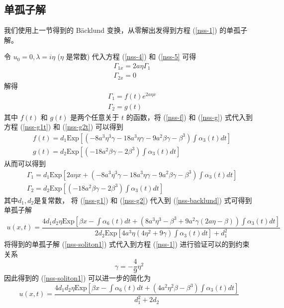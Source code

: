 \subsection{单孤子解}
我们使用上一节得到的 B\"acklund 变换，从零解出发得到方程 (\ref{nss-1}) 的单孤子解。

令 $u_{0} = 0, \lambda = i\eta$ ($\eta$ 是常数) 代入方程 (\ref{nss-4}) 和 (\ref{nss-5} 可得
\begin{align}
  & \Gamma_{1x} = 2a\eta\Gamma_{1} \\
  & \Gamma_{2x} = 0
\end{align}
解得
\begin{align}
  & \Gamma_{1} = f(t)e^{2a\eta x} \label{nss-f} \\
  & \Gamma_{2} = g(t)  \label{nss-g}
\end{align}
其中 $f(t)$ 和 $g(t)$ 是两个任意关于  $t$ 的函数，将 (\ref{nss-f}) 和 (\ref{nss-g}) 式代入到方程 (\ref{nss-g1t}) 和 (\ref{nss-g2t}) 可以得到
\begin{align}
  & f(t) = d_{1}\mathrm{Exp}\left[\left(-8a^3\eta^3\gamma-18a^3\eta \gamma-9a^2\beta \gamma - \beta^3\right)\int \alpha_{3}(t)dt\right] \\
  & g(t) = d_{2}\mathrm{Exp}\left[\left(-18a^2\beta \gamma-2\beta^3\right)\int \alpha_{3}(t)dt\right]
\end{align}
从而可以得到
\begin{align}
  & \Gamma_{1} = d_{1}\mathrm{Exp}\left[2a\eta x + \left(-8a^3\eta^3\gamma-18a^3\eta \gamma-9a^2\beta \gamma - \beta^3\right)\int \alpha_{3}(t)dt\right]  \label{nss-g1} \\
  & \Gamma_{2} = d_{2}\mathrm{Exp}\left[\left(-18a^2\beta \gamma-2\beta^3\right)\int \alpha_{3}(t)dt\right]  \label{nss-g2}
\end{align}
其中$d_{1}, d_{2}$是复常数， 将  (\ref{nss-g1}) 和  (\ref{nss-g2}) 代入到  (\ref{nss-backlund}) 式可得到单孤子解
\begin{align}
    u(x,t) = \dfrac{4d_1d_2\eta\mathrm{Exp}\left[\beta x - \int \alpha_6(t)dt + (8a^3\eta^3-\beta^3+9a^2\gamma(2a\eta-\beta))\int \alpha_3(t)dt\right]}{2d_2 \mathrm{Exp}\left[4a^3\eta(4\eta^2+9\gamma)\int \alpha_3(t)dt\right] + d_1^2} \label{nss-soliton1}
\end{align}
将得到的单孤子解 (\ref{nss-soliton1}) 式代入到方程 (\ref{nss-1}) 进行验证可以的到约束关系
\begin{equation}
  \gamma = -\dfrac{4}{9}\eta^2
\end{equation}
因此得到的 (\ref{nss-soliton1}) 可以进一步的简化为
\begin{equation}
  u(x,t) = \frac{4d_1d_2\eta \mathrm{Exp}\left[\beta x - \int \alpha_6(t)dt + (4a^2\eta^2\beta - \beta^3)\int \alpha_3(t)dt\right]}{d_1^2 + 2d_2} \label{nss-soliton2}
\end{equation}

